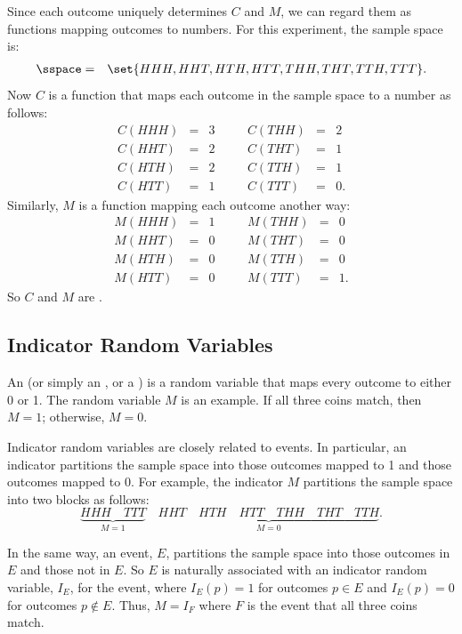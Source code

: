 Since each outcome uniquely determines $C$ and $M$, we can regard them
as functions mapping outcomes to numbers.  For this experiment, the
sample space is:
\begin{eqnarray*}
\sspace & = & \set{ HHH, HHT, HTH, HTT, THH, THT, TTH, TTT }.
\end{eqnarray*}
Now $C$ is a function that maps each outcome in the sample space to a 
number as follows:
\[
\begin{array}{rclcrcl}
C(HHH) & = & 3 & \quad & C(THH) & = & 2 \\
C(HHT) & = & 2 & \quad & C(THT) & = & 1 \\
C(HTH) & = & 2 & \quad & C(TTH) & = & 1 \\
C(HTT) & = & 1 & \quad & C(TTT) & = & 0.
\end{array}
\]
Similarly, $M$ is a function mapping each outcome another way:
\[
\begin{array}{rclcrcl}
M(HHH) & = & 1 & \quad & M(THH) & = & 0 \\
M(HHT) & = & 0 & \quad & M(THT) & = & 0 \\
M(HTH) & = & 0 & \quad & M(TTH) & = & 0 \\
M(HTT) & = & 0 & \quad & M(TTT) & = & 1.
\end{array}
\]
So $C$ and $M$ are .

\subsection{Indicator Random Variables}

An  (or simply an , or
a ) is a random variable that maps
every outcome to either 0 or 1.  The random variable $M$ is an
example.  If all three coins match, then $M=1$; otherwise, $M = 0$.

Indicator random variables are closely related to events.  In
particular, an indicator partitions the sample space into those
outcomes mapped to 1 and those outcomes mapped to 0.  For example, the
indicator $M$ partitions the sample space into two blocks as follows:
\[
\underbrace{HHH \quad TTT}_{\text{$M = 1$}} \quad
\underbrace{HHT \quad HTH \quad HTT \quad
        THH \quad THT \quad TTH}_{\text{$M = 0$}}.
\]

In the same way, an event, $E$, partitions the sample space into those
outcomes in $E$ and those not in $E$.  So $E$ is naturally associated with
an indicator random variable, $I_E$, for the event, where $I_E(p) = 1$ for
outcomes $p \in E$ and $I_E(p) = 0$ for outcomes $p \notin E$.  Thus,
$M=I_F$ where $F$ is the event that all three coins match.

